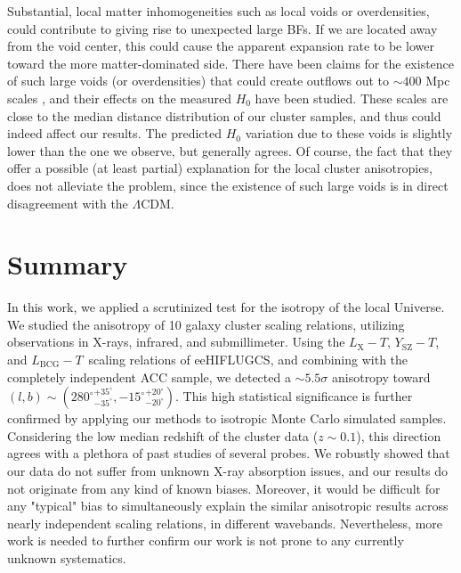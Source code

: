 \documentclass{aa}   %
\newcommand{\LT}{$L_{\text{X}}-T$}
\newcommand{\YT}{$Y_{\text{SZ}}-T$}
\newcommand{\LbcgT}{$L_{\text{BCG}}-T$}
\begin{document}
Substantial, local matter inhomogeneities such as local voids or overdensities, could contribute to giving rise to unexpected large BFs. If we are located away from the void center, this could cause the apparent expansion rate to be lower toward the more matter-dominated side. There have been claims for the existence of such large voids (or overdensities) that could create outflows out to $\sim 400$ Mpc scales \citep[][and references therein]{keenan,rubart14,whitbourn,shanks19b,shanks19,tully19,bohringer20,kazantzidis,moritz}, and their effects on the measured $H_0$ have been studied. These scales are close to the median distance distribution of our cluster samples, and thus could indeed affect our results. The predicted $H_0$ variation due to these voids is slightly lower than the one we observe, but generally agrees. Of course, the fact that they offer a possible (at least partial) explanation for the local cluster anisotropies, does not alleviate the problem, since the existence of such large voids is in direct disagreement with the $\Lambda$CDM.

\section{Summary} \label{conclusions}

In this work, we applied a scrutinized test for the isotropy of the local Universe. We studied the anisotropy of 10 galaxy cluster scaling relations, utilizing observations in X-rays, infrared, and submillimeter. Using the \LT, \YT, and \LbcgT\ scaling relations of eeHIFLUGCS, and combining with the completely independent ACC sample, we detected a $\sim 5.5\sigma$ anisotropy toward $(l,b)\sim ({280^{\circ}}^{+35^{\circ}}_{-35^{\circ}},{-15^{\circ}}^{+20^{\circ}}_{-20^{\circ}})$. This high statistical significance is further confirmed by applying our methods to isotropic Monte Carlo simulated samples. Considering the low median redshift of the cluster data ($z\sim 0.1$), this direction agrees with a plethora of past studies of several probes. We robustly showed that our data do not suffer from unknown X-ray absorption issues, and our results do not originate from any kind of known biases. Moreover, it would be difficult for any "typical" bias to simultaneously explain the similar anisotropic results across nearly independent scaling relations, in different wavebands. Nevertheless, more work is needed to further confirm our work is not prone to any currently unknown systematics.
\end{document}
